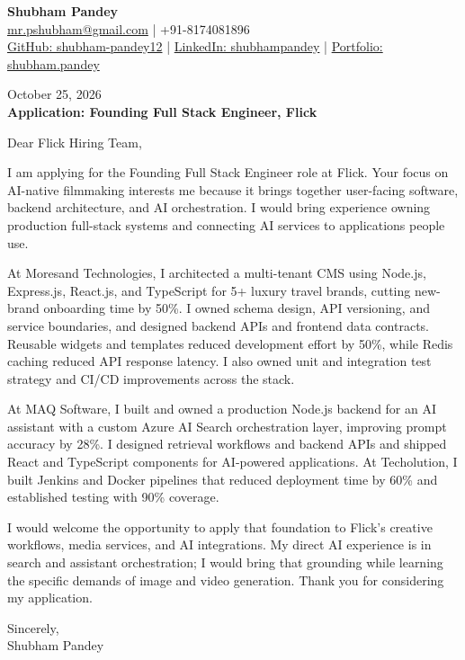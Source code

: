 \documentclass[a4paper,10pt]{article}
\begin{document}
\begin{center}
{\LARGE\textbf{Shubham Pandey}}\\[3pt]
\href{mailto:mr.pshubham@gmail.com}{mr.pshubham@gmail.com} | +91-8174081896\\[2pt]
\href{https://github.com/shubham-pandey12}{GitHub: shubham-pandey12} | \href{https://www.linkedin.com/in/shubham-pandey-a74716199/}{LinkedIn: shubhampandey} | \href{https://shubham-portfolio-mocha.vercel.app/}{Portfolio: shubham.pandey}
\end{center}
October 25, 2026\\[6pt]
\textbf{Application: Founding Full Stack Engineer, Flick}

\vspace{10pt}
Dear Flick Hiring Team,

I am applying for the Founding Full Stack Engineer role at Flick. Your focus on AI-native filmmaking interests me because it brings together user-facing software, backend architecture, and AI orchestration. I would bring experience owning production full-stack systems and connecting AI services to applications people use.

At Moresand Technologies, I architected a multi-tenant CMS using Node.js, Express.js, React.js, and TypeScript for 5+ luxury travel brands, cutting new-brand onboarding time by 50\%. I owned schema design, API versioning, and service boundaries, and designed backend APIs and frontend data contracts. Reusable widgets and templates reduced development effort by 50\%, while Redis caching reduced API response latency. I also owned unit and integration test strategy and CI/CD improvements across the stack.

At MAQ Software, I built and owned a production Node.js backend for an AI assistant with a custom Azure AI Search orchestration layer, improving prompt accuracy by 28\%. I designed retrieval workflows and backend APIs and shipped React and TypeScript components for AI-powered applications. At Techolution, I built Jenkins and Docker pipelines that reduced deployment time by 60\% and established testing with 90\% coverage.

I would welcome the opportunity to apply that foundation to Flick's creative workflows, media services, and AI integrations. My direct AI experience is in search and assistant orchestration; I would bring that grounding while learning the specific demands of image and video generation. Thank you for considering my application.

\vspace{8pt}
Sincerely,\\[4pt]
Shubham Pandey
\end{document}
